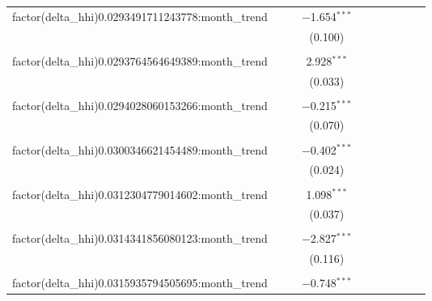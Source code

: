 \begin{table}[H]
{\begin{tabular}{@{\extracolsep{5pt}}lccccccccc}
  factor(delta\_hhi)0.0293491711243778:month\_trend &  &  & $-$1.654$^{***}$ &  &  &  &  &  &  \\  

   &  &  & (0.100) &  &  &  &  &  &  \\  

   & & & & & & & & & \\  

  factor(delta\_hhi)0.0293764564649389:month\_trend &  &  & 2.928$^{***}$ &  &  &  &  &  &  \\  

   &  &  & (0.033) &  &  &  &  &  &  \\  

   & & & & & & & & & \\  

  factor(delta\_hhi)0.0294028060153266:month\_trend &  &  & $-$0.215$^{***}$ &  &  &  &  &  &  \\  

   &  &  & (0.070) &  &  &  &  &  &  \\  

   & & & & & & & & & \\  

  factor(delta\_hhi)0.0300346621454489:month\_trend &  &  & $-$0.402$^{***}$ &  &  &  &  &  &  \\  

   &  &  & (0.024) &  &  &  &  &  &  \\  

   & & & & & & & & & \\  

  factor(delta\_hhi)0.0312304779014602:month\_trend &  &  & 1.098$^{***}$ &  &  &  &  &  &  \\  

   &  &  & (0.037) &  &  &  &  &  &  \\  

   & & & & & & & & & \\  

  factor(delta\_hhi)0.0314341856080123:month\_trend &  &  & $-$2.827$^{***}$ &  &  &  &  &  &  \\  

   &  &  & (0.116) &  &  &  &  &  &  \\  

   & & & & & & & & & \\  

  factor(delta\_hhi)0.0315935794505695:month\_trend &  &  & $-$0.748$^{***}$ &  &  &  &  &  &  \\  


\end{tabular}}
\end{table}
